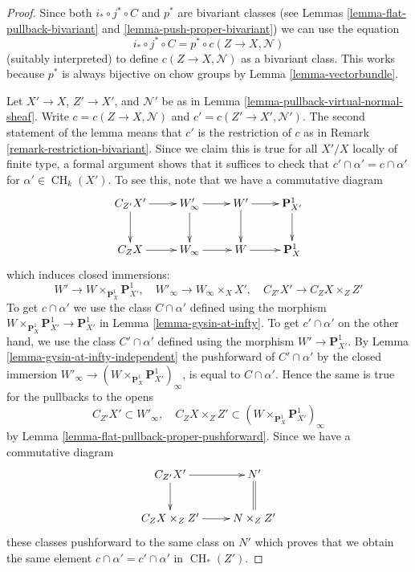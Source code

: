 \documentclass[10pt,a4paper]{amsart}
\theoremstyle{plain}
\theoremstyle{definition}
\theoremstyle{remark}
\numberwithin{equation}{subsection}
\def\CH{\mathop{\mathrm{CH}}\nolimits}
\begin{document}
\begin{proof}
Since both $i_* \circ j^* \circ C$ and $p^*$ are bivariant classes
(see Lemmas \ref{lemma-flat-pullback-bivariant} and
\ref{lemma-push-proper-bivariant}) we can use the equation
$$
i_* \circ j^* \circ C  = p^* \circ c(Z \to X, \mathcal{N})
$$
(suitably interpreted) to define $c(Z \to X, \mathcal{N})$
as a bivariant class. This works because $p^*$ is always
bijective on chow groups by Lemma \ref{lemma-vectorbundle}.

\medskip\noindent
Let $X' \to X$, $Z' \to X'$, and $\mathcal{N}'$ be as in
Lemma \ref{lemma-pullback-virtual-normal-sheaf}. Write
$c = c(Z \to X, \mathcal{N})$ and $c' = c(Z' \to X', \mathcal{N}')$.
The second statement of the lemma means that $c'$ is the restriction of $c$
as in Remark \ref{remark-restriction-bivariant}. Since we claim this
is true for all $X'/X$ locally of finite type, a formal argument
shows that it suffices to check that $c' \cap \alpha' = c \cap \alpha'$
for $\alpha' \in \CH_k(X')$.
To see this, note that we have a commutative diagram
$$
\xymatrix{
C_{Z'}X' \ar[d] \ar[r] &
W'_\infty \ar[d] \ar[r] &
W' \ar[d] \ar[r] &
\mathbf{P}^1_{X'} \ar[d] \\
C_ZX \ar[r] &
W_\infty \ar[r] &
W \ar[r] &
\mathbf{P}^1_X
}
$$
which induces closed immersions:
$$
W' \to W \times_{\mathbf{P}^1_X} \mathbf{P}^1_{X'},\quad
W'_\infty \to W_\infty \times_X X',\quad
C_{Z'}X' \to C_ZX \times_Z Z'
$$
To get $c \cap \alpha'$ we use the class $C \cap \alpha'$
defined using the morphism
$W \times_{\mathbf{P}^1_X} \mathbf{P}^1_{X'} \to \mathbf{P}^1_{X'}$
in Lemma \ref{lemma-gysin-at-infty}.
To get $c' \cap \alpha'$ on the other hand, we use the class
$C' \cap \alpha'$ defined using the morphism $W' \to \mathbf{P}^1_{X'}$.
By Lemma \ref{lemma-gysin-at-infty-independent} the pushforward of
$C' \cap \alpha'$ by the closed immersion
$W'_\infty \to (W \times_{\mathbf{P}^1_X} \mathbf{P}^1_{X'})_\infty$,
is equal to $C \cap \alpha'$. Hence the same is true for the pullbacks
to the opens
$$
C_{Z'}X' \subset W'_\infty,\quad
C_ZX \times_Z Z' \subset (W \times_{\mathbf{P}^1_X} \mathbf{P}^1_{X'})_\infty
$$
by Lemma \ref{lemma-flat-pullback-proper-pushforward}.
Since we have a commutative diagram
$$
\xymatrix{
C_{Z'} X' \ar[d] \ar[r] & N' \ar@{=}[d] \\
C_ZX \times_Z Z' \ar[r] & N \times_Z Z'
}
$$
these classes pushforward to the same class on $N'$ which
proves that we obtain the same element $c \cap \alpha' = c' \cap \alpha'$
in $\CH_*(Z')$.
\end{proof}
\end{document}
